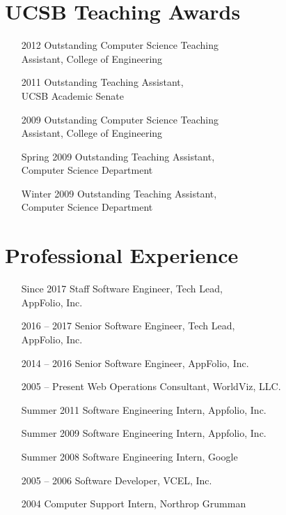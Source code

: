 \documentclass[10pt,letterpaper,oneside,twocolumn]{article}
\begin{document}
\section{UCSB Teaching Awards}
\begin{itemize}
  \item [2012] Outstanding Computer Science Teaching\\ Assistant, College of
    Engineering
  \item [2011] Outstanding Teaching Assistant,\\ UCSB Academic Senate
  \item [2009] Outstanding Computer Science Teaching\\ Assistant, College of
    Engineering
  \item [Spring 2009] Outstanding Teaching Assistant,\\ Computer Science
    Department
  \item [Winter 2009] Outstanding Teaching Assistant,\\ Computer Science
    Department
\end{itemize}


\section{Professional Experience}
\begin{itemize}
  \item [Since 2017] Staff Software Engineer, Tech Lead,\\ AppFolio, Inc.
  \item [2016 -- 2017] Senior Software Engineer, Tech Lead,\\ AppFolio, Inc.
  \item [2014 -- 2016] Senior Software Engineer, AppFolio, Inc.
  \item [2005 -- Present] Web Operations Consultant, WorldViz, LLC.
  \item [Summer 2011] Software Engineering Intern, Appfolio, Inc.
  \item [Summer 2009] Software Engineering Intern, Appfolio, Inc.
  \item [Summer 2008] Software Engineering Intern, Google
  \item [2005 -- 2006] Software Developer, VCEL, Inc.
  \item [2004] Computer Support Intern, Northrop Grumman
\end{itemize}
\end{document}
